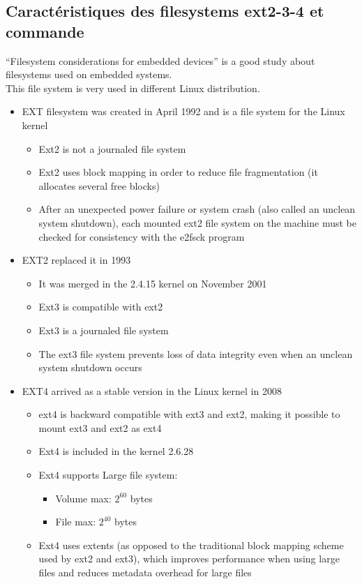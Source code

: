 \documentclass[resume]{subfiles}
\begin{document}
\subsection{Caractéristiques des filesystems ext2-3-4 et commande}
“Filesystem considerations for embedded devices” is a good study about filesystems used on embedded systems.\\
This file system is very used in different Linux distribution.
\begin{itemize}
    \item EXT filesystem was created in April 1992 and is a file system for the Linux kernel
    \begin{itemize}
        \item Ext2 is not a journaled file system
        \item Ext2 uses block mapping in order to reduce file fragmentation (it allocates several free blocks)
        \item After an unexpected power failure or system crash (also called an unclean system shutdown), each mounted ext2 file system on the machine must be checked for consistency with the e2fsck program
    \end{itemize}
    \item EXT2 replaced it in 1993
    \begin{itemize}
        \item It was merged in the 2.4.15 kernel on November 2001
        \item Ext3 is compatible with ext2
        \item Ext3 is a journaled file system
        \item The ext3 file system prevents loss of data integrity even when an
        unclean system shutdown occurs
    \end{itemize}
    \item EXT4 arrived as a stable version in the Linux kernel in 2008
    \begin{itemize}
        \item ext4 is backward compatible with ext3 and ext2, making it possible to mount ext3 and ext2 as ext4
        \item Ext4 is included in the kernel 2.6.28
        \item Ext4 supports Large file system:
        \begin{itemize}
            \item Volume max: $2^60$ bytes
            \item File max: $2^40$ bytes
        \end{itemize}
        \item Ext4 uses extents (as opposed to the traditional block mapping scheme used by ext2 and ext3), which improves performance when using large files and reduces metadata overhead for large files
    \end{itemize}
\end{itemize}
\end{document}
